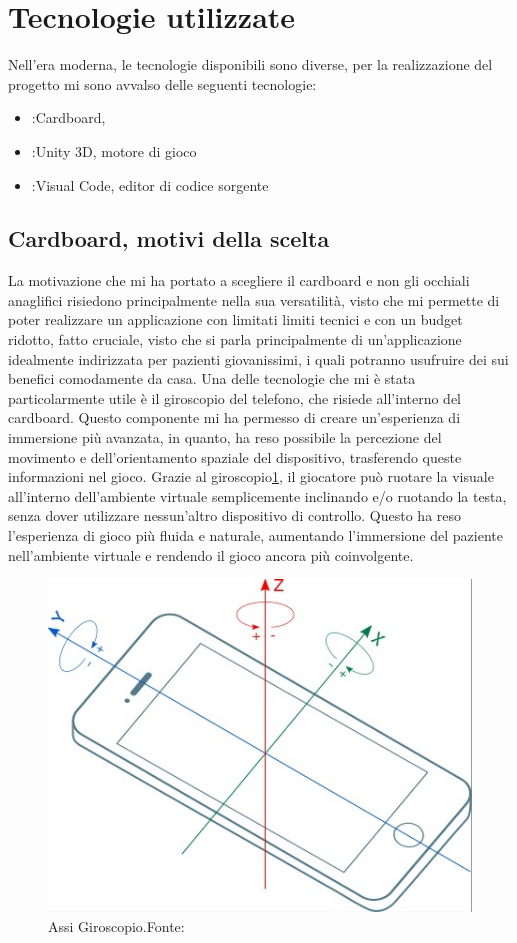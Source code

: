 \documentclass[
a4paper,
cleardoublepage=empty,
headings=twolinechapter,
numbers=autoenddot,
]{scrbook}
\begin{document}
    \section{Tecnologie utilizzate}
    Nell'era moderna, le tecnologie disponibili sono diverse, per la realizzazione del progetto mi sono avvalso delle seguenti tecnologie:
    \begin{itemize}
    	\item:Cardboard, 
    	\item:Unity 3D, motore di gioco
    	\item:Visual Code, editor di codice sorgente
    \end{itemize}
  \subsection{Cardboard, motivi della scelta}\label{chap:cardboard_motivi}
    La motivazione che mi ha portato a scegliere il cardboard e non gli occhiali anaglifici risiedono principalmente nella sua versatilità, visto che mi permette di poter realizzare un applicazione con limitati limiti tecnici e con un budget ridotto, fatto cruciale, visto che si parla principalmente di un'applicazione idealmente indirizzata per pazienti giovanissimi, i quali potranno usufruire dei sui benefici comodamente da casa.
    Una delle tecnologie che mi è stata particolarmente utile è il giroscopio del telefono, che risiede all'interno del cardboard. Questo componente mi ha permesso di creare un'esperienza di immersione più avanzata, in quanto, ha reso possibile la percezione del movimento e dell'orientamento spaziale del dispositivo, trasferendo queste informazioni nel gioco. Grazie al giroscopio\ref{fig:giroscopio}, il giocatore può ruotare la visuale all'interno dell'ambiente virtuale semplicemente inclinando e/o ruotando la testa, senza dover utilizzare nessun'altro dispositivo di controllo. Questo ha reso l'esperienza di gioco più fluida e naturale, aumentando l'immersione del paziente nell'ambiente virtuale e rendendo il gioco ancora più coinvolgente.
     \begin{figure}[H]
    	\centering
    	\includegraphics[width=0.5\linewidth]{image/giroscopio}
    	\caption{Assi Giroscopio.Fonte:\cite{Giro_image}}
    	\label{fig:giroscopio}
    \end{figure}
\end{document}
